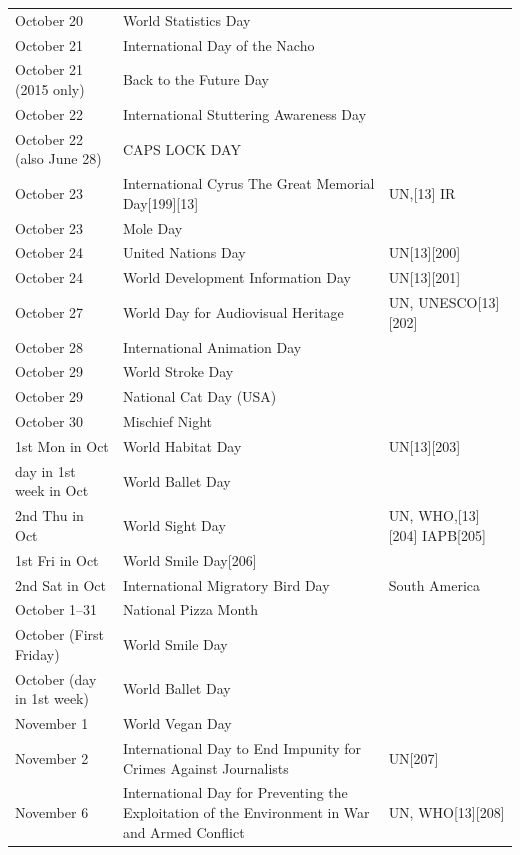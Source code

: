 \documentclass[
  openany]{book}
\begin{document}
\begin{longtable}[t]{>{\raggedright\arraybackslash}p{8em}>{\raggedright\arraybackslash}p{20em}>{\raggedright\arraybackslash}p{12em}}
October 20 & World Statistics Day & \\
\rowcolor{gray!6}  October 21 & International Day of the Nacho & \\
\addlinespace
October 21 (2015 only) & Back to the Future Day & \\
\rowcolor{gray!6}  October 22 & International Stuttering Awareness Day & \\
October 22 (also June 28) & CAPS LOCK DAY & \\
\rowcolor{gray!6}  October 23 & International Cyrus The Great Memorial Day[199][13] & UN,[13] IR\\
October 23 & Mole Day & \\
\addlinespace
\rowcolor{gray!6}  October 24 & United Nations Day & UN[13][200]\\
October 24 & World Development Information Day & UN[13][201]\\
\rowcolor{gray!6}  October 27 & World Day for Audiovisual Heritage & UN, UNESCO[13][202]\\
October 28 & International Animation Day & \\
\rowcolor{gray!6}  October 29 & World Stroke Day & \\
\addlinespace
October 29 & National Cat Day (USA) & \\
\rowcolor{gray!6}  October 30 & Mischief Night & \\
1st Mon in Oct & World Habitat Day & UN[13][203]\\
\rowcolor{gray!6}  day in 1st week in Oct & World Ballet Day & \\
2nd Thu in Oct & World Sight Day & UN, WHO,[13][204] IAPB[205]\\
\addlinespace
\rowcolor{gray!6}  1st Fri in Oct & World Smile Day[206] & \\
2nd Sat in Oct & International Migratory Bird Day & South America\\
\rowcolor{gray!6}  October 1–31 & National Pizza Month & \\
October (First Friday) & World Smile Day & \\
\rowcolor{gray!6}  October (day in 1st week) & World Ballet Day & \\
\addlinespace
November 1 & World Vegan Day & \\
\rowcolor{gray!6}  November 2 & International Day to End Impunity for Crimes Against Journalists & UN[207]\\
November 6 & International Day for Preventing the Exploitation of the Environment in War and Armed Conflict & UN, WHO[13][208]\\

\end{longtable}
\end{document}
